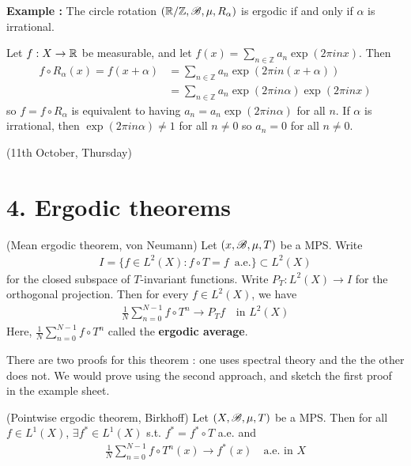 \documentclass[10pt,a4paper]{report}
\newenvironment{proof}
{\begin{changemargin}{1cm}{0.5cm} 
	}%
	{\end{changemargin}
}
\begin{document}
\textbf{Example :} The circle rotation $(\mathbb{R}/\mathbb{Z},\mathscr{B}, \mu, R_{\alpha})$ is ergodic if and only if $\alpha$ is irrational.

\begin{proof}
\pf Let $f:X\rightarrow \mathbb{R}$ be measurable, and let $f(x) = \sum_{n\in \mathbb{Z}} a_n \exp(2\pi i nx)$. Then
\begin{align*}
f\circ R_{\alpha}(x) = f(x+\alpha) &= \sum_{n\in \mathbb{Z}}a_n \exp(2\pi in (x+\alpha)) \\
&= \sum_{n\in \mathbb{Z}} a_n \exp(2\pi in\alpha) \exp(2\pi i nx)
\end{align*}
so $f=f\circ R_{\alpha}$ is equivalent to having $a_n = a_n \exp(2\pi i n \alpha)$ for all $n$.
If $\alpha$ is irrational, then $\exp(2\pi in\alpha) \neq 1$ for all $n\neq 0$ so $a_n=0$ for all $n\neq 0$.

\eop
\end{proof}
\s

\newday

(11th October, Thursday)
\s

\section*{4. Ergodic theorems}

\thm (Mean ergodic theorem, von Neumann) Let $(x,\mathscr{B}, \mu, T)$ be a MPS. Write
\begin{align*}
I = \{ f\in L^2(X) : f\circ T = f \,\,\, \text{a.e.} \}  \subset L^2(X)
\end{align*}
for the closed subspace of $T$-invariant functions. Write $P_T : L^2(X) \rightarrow I$ for the orthogonal projection. Then for every $f\in L^2(X)$, we have
\begin{align*}
\frac{1}{N} \sum_{n=0}^{N-1} f\circ T^n \rightarrow P_T f \quad \text{in } L^2(X)
\end{align*}
Here, $\frac{1}{N} \sum_{n=0}^{N-1} f\circ T^n$ called the \textbf{ergodic average}.
\s

There are two proofs for this theorem : one uses spectral theory and the the other does not. We would prove using the second approach, and sketch the first proof in the example sheet.

\s

\thm (Pointwise ergodic theorem, Birkhoff) Let $(X,\mathscr{B}, \mu, T)$ be a MPS. Then for all $f\in L^1(X)$, $\exists f^* \in L^1(X)$ s.t. $f^* = f^* \circ T$ a.e. and 
\begin{align*}
\frac{1}{N} \sum_{n=0}^{N-1} f\circ T^n (x) \rightarrow f^*(x) \quad \text{a.e. in } X 
\end{align*}
\s
\end{document}
